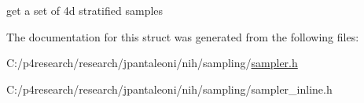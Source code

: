 \label{structnih_1_1_m_j_sampler_a4c2fc9b264a9f2de35125d51e4e19fe4}
get a set of 4d stratified samples 

\-The documentation for this struct was generated from the following files\-:\begin{DoxyCompactItemize}
\item 
\-C\-:/p4research/research/jpantaleoni/nih/sampling/\hyperlink{sampler_8h}{sampler.\-h}\item 
\-C\-:/p4research/research/jpantaleoni/nih/sampling/sampler\-\_\-inline.\-h\end{DoxyCompactItemize}
